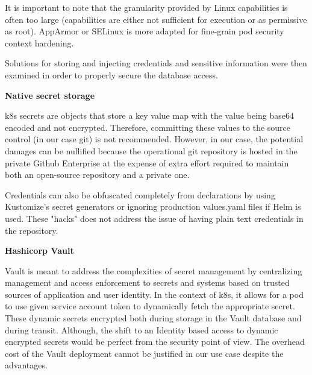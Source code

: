 \documentclass[11pt]{article}
\begin{document}
It is important to note that the granularity provided by Linux capabilities is often too large (capabilities are either not sufficient for execution or as permissive as root). AppArmor or SELinux is more adapted for fine-grain pod security context hardening.



\vspace{-5mm}\hspace{5mm} Solutions for storing and injecting credentials and sensitive information were then examined in order to properly secure the database access. 

\vspace{3mm}
\textbf{Native secret storage}

k8s secrets are objects that store a key value map with the value being base64 encoded and not encrypted. Therefore, committing these values to the source control (in our case git) is not recommended. However, in our case, the potential damages can be nullified because the operational git repository is hosted in the private Github Enterprise at the expense of extra effort required to maintain both an open-source repository and a private one.  

Credentials can also be obfuscated completely from declarations by using Kustomize's secret generators or ignoring production values.yaml files if Helm is used. These "hacks" does not address the issue of having plain text credentials in the repository.  

\vspace{3mm}
\textbf{Hashicorp Vault}

Vault is meant to address the complexities of secret management by centralizing management and access enforcement to secrets and systems based on trusted sources of application and user identity. In the context of k8s, it allows for a pod to use given service account token to dynamically fetch the appropriate secret. These dynamic secrets encrypted both during storage in the Vault database and during transit. Although, the shift to an Identity based access to dynamic encrypted secrets would be perfect from the security point of view. The overhead cost of the Vault deployment cannot be justified in our use case despite the advantages.

\end{document}
